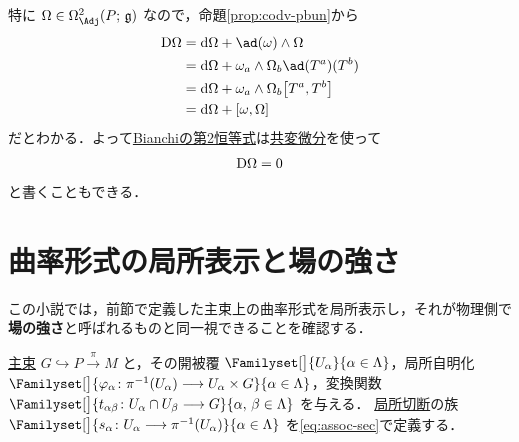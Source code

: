 \documentclass[geometry_main]{subfiles}
\begin{document}
特に $\Omega \in \Omega^2_{\Adj} (P;\, \mathfrak{g})$ なので，命題\ref{prop:codv-pbun}から
\begin{align}
    \codd{\Omega} 
    &= \dd{\Omega} + \ad (\omega) \wedge \Omega \\
    &= \dd{\Omega} + \omega_a \wedge \Omega_b\ad(T^a)(T^b) \\
    &= \dd{\Omega} + \omega_a \wedge \Omega_b \comm{T^a}{T^b} \\
    &= \dd{\Omega} + \comm{\omega}{\Omega}
\end{align}
だとわかる．よって\hyperref[thm:curvature]{Bianchiの第2恒等式}は\hyperref[def:codv-pbun]{共変微分}を使って
\begin{align}
    \label{eq:Bianchi-second}
    \mathrm{D}\Omega = 0
\end{align}
と書くこともできる．

\section{曲率形式の局所表示と場の強さ}

この小説では，前節で定義した主束上の曲率形式を局所表示し，それが物理側で\textbf{場の強さ}と呼ばれるものと同一視できることを確認する．

\hyperref[def.PFD]{主束} $G \hookrightarrow P \xrightarrow{\pi} M$ と，その開被覆 $\Familyset[\big]{U_\alpha}{\alpha \in \Lambda}$，局所自明化 $\Familyset[\big]{\varphi_\alpha \colon \pi^{-1}(U_\alpha) \lto U_\alpha \times G}{\alpha \in \Lambda}$，変換関数 $\Familyset[\big]{t_{\alpha\beta} \colon U_\alpha \cap U_\beta \lto G}{\alpha,\, \beta \in \Lambda}$ を与える．
\hyperref[def.section]{局所切断}の族 $\Familyset[\big]{s_\alpha \colon U_\alpha \lto \pi^{-1}(U_\alpha)}{\alpha \in \Lambda}$ を\eqref{eq:assoc-sec}で定義する． 
\end{document}
